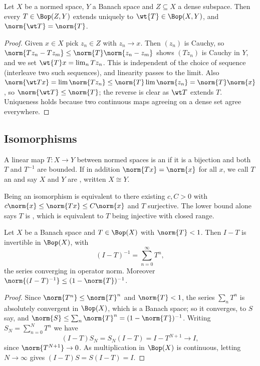 \begin{proposition}
	Let $X$ be a normed space, $Y$ a Banach space and $Z \subseteq X$ a dense subspace. Then every $T \in \Bop(Z, Y)$ extends uniquely to $\wt{T} \in \Bop(X,Y)$, and $\norm{\wt T} = \norm{T}$.
\end{proposition}

\begin{proof}
	Given $x \in X$ pick $z_n \in Z$ with $z_n \to x$. Then $(z_n)$ is Cauchy, so $\norm{Tz_n - Tz_m} \leq \norm{T} \norm{z_n - z_m}$ shows $(Tz_n)$ is Cauchy in $Y$, and we set $\wt{T}x = \lim_n Tz_n$. This is independent of the choice of sequence (interleave two such sequences), and linearity passes to the limit. Also $\norm{\wt T x} = \lim \norm{Tz_n} \leq \norm{T}\lim\norm{z_n} = \norm{T}\norm{x}$, so $\norm{\wt T} \leq \norm{T}$; the reverse is clear as $\wt T$ extends $T$. Uniqueness holds because two continuous maps agreeing on a dense set agree everywhere.
\end{proof}

\subsection{Isomorphisms}

\begin{definition}[Isomorphism]
	A linear map $T : X \to Y$ between normed spaces is an  if it is a bijection and both $T$ and $T^{-1}$ are bounded. If in addition $\norm{Tx} = \norm{x}$ for all $x$, we call $T$ an  and say $X$ and $Y$ are , written $X \cong Y$.
\end{definition}

Being an isomorphism is equivalent to there existing $c, C > 0$ with $c\norm{x} \leq \norm{Tx} \leq C\norm{x}$ and $T$ surjective. The lower bound alone says $T$ is , which is equivalent to $T$ being injective with closed range.

\begin{proposition}
	Let $X$ be a Banach space and $T \in \Bop(X)$ with $\norm{T} < 1$. Then $I - T$ is invertible in $\Bop(X)$, with
	$$(I - T)^{-1} = \sum_{n=0}^\infty T^n,$$
	the series converging in operator norm. Moreover $\norm{(I-T)^{-1}} \leq (1 - \norm{T})^{-1}$.
\end{proposition}

\begin{proof}
	Since $\norm{T^n} \leq \norm{T}^n$ and $\norm{T} < 1$, the series $\sum_n T^n$ is absolutely convergent in $\Bop(X)$, which is a Banach space; so it converges, to $S$ say, and $\norm{S} \leq \sum_n \norm{T}^n = (1-\norm{T})^{-1}$. Writing $S_N = \sum_{n=0}^N T^n$ we have
	$$(I - T)S_N = S_N(I-T) = I - T^{N+1} \longrightarrow I,$$
	since $\norm{T^{N+1}} \to 0$. As multiplication in $\Bop(X)$ is continuous, letting $N \to \infty$ gives $(I-T)S = S(I-T) = I$.
\end{proof}

